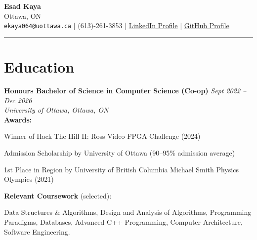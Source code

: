 \documentclass[11pt]{article}
\begin{document}
\begin{center}
    {\Huge \textbf{Esad Kaya}}\\
    \vspace{5pt}
    Ottawa, ON \\
    \texttt{ekaya064@uottawa.ca} \quad | \quad (613)-261-3853 \quad | \quad
    \href{https://www.linkedin.com/in/esad-kaya-28b400215/}{LinkedIn Profile} \quad | \quad
    \href{https://github.com/Integer-Conversion-Error}{GitHub Profile}
\end{center}


\hrule
\vspace{-0.4em}



\section*{Education}
\noindent\textbf{Honours Bachelor of Science in Computer Science (Co-op)} \hfill \textit{Sept 2022 -- Dec 2026} \\
\textit{University of Ottawa, Ottawa, ON} \\

\noindent\textbf{Awards:}
\begin{small}
\begin{compactitem}
    \item Winner of Hack The Hill II: Ross Video FPGA Challenge (2024)
    \item Admission Scholarship by University of Ottawa (90--95\% admission average)
    \item 1st Place in Region by University of British Columbia Michael Smith Physics Olympics (2021)

\end{compactitem}
\end{small}

\noindent\textbf{Relevant Coursework} (selected):
\begin{small}Data Structures \& Algorithms, Design and Analysis of Algorithms, Programming Paradigms, Databases, Advanced C++ Programming, Computer Architecture, Software Engineering.
\end{small}
\end{document}
